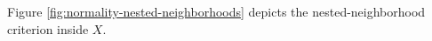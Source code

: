\noindent Figure \ref{fig:normality-nested-neighborhoods} depicts the nested-neighborhood criterion inside $X$.

\begin{illustrationfigure}[H]
  
  \caption{Normality thickens closed $F\subseteq U$ to an open $O$ with $F\subseteq O\subseteq\overline{O}\subseteq U$.}
  \label{fig:normality-nested-neighborhoods}
\end{illustrationfigure}
